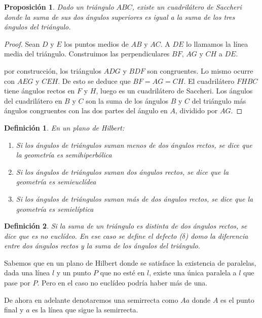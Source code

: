 \documentclass[a4paper]{amsart}
\theoremstyle{plain}
\newtheorem{definition}{Definición}
\newtheorem{proposition}{Proposición}
\begin{document}
\begin{proposition}
Dado un triángulo $ABC$, existe un cuadrilátero de Saccheri donde la suma de sus dos ángulos superiores es igual a la suma de los tres ángulos del triángulo.
\end{proposition}

\begin{proof}
Sean $D$ y $E$ los puntos medios de $AB$ y $AC$. A $DE$ lo llamamos la línea media del triángulo. Construimos las perpendiculares $BF$, $AG$ y $CH$ a $DE$.

por construcción, los triángulos $ADG$ y $BDF$ son congruentes. Lo mismo ocurre con $AEG$ y $CEH$. De esto se deduce que $BF=AG=CH$. El cuadrilátero $FHBC$ tiene ángulos rectos en $F$ y $H$, luego es un cuadrilátero de Saccheri. Los ángulos del cuadrilátero en $B$ y $C$ son la suma de los ángulos $B$ y $C$ del triángulo más ángulos congruentes con las dos partes del ángulo en $A$, dividido por $AG$.
\end{proof}

\begin{definition}
En un plano de Hilbert:
\begin{enumerate}
\item [(a)] Si los ángulos de triángulos suman menos de dos ángulos rectos, se dice que la geometría es semihiperbólica
\item[(b)] Si los ángulos de triángulos suman dos ángulos rectos, se dice que la geometría es semieuclídea
\item[(c)] Si los ángulos de triángulos suman más de dos ángulos rectos, se dice que la geometría es semielíptica
\end{enumerate}
\end{definition}

\begin{definition}
Si la suma de un triángulo es distinta de dos ángulos rectos, se dice que es no euclídeo. En ese caso se define el defecto ($\delta$) domo la diferencia entre dos ángulos rectos y la suma de los ángulos del triángulo.
\end{definition}

Sabemos que en un plano de Hilbert donde se satisface la existencia de paralelas, dada una línea $l$ y un punto $P$ que no esté en $l$, existe una única paralela a $l$ que pase por $P$. Pero en el caso no euclídeo podría haber más de una.

De ahora en adelante denotaremos una semirrecta como $Aa$ donde $A$ es el punto final y $a$ es la línea que sigue la semirrecta.
\end{document}
